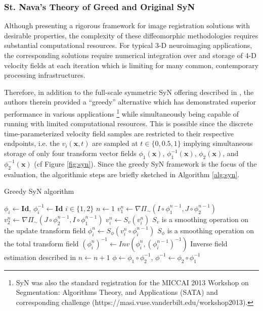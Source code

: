 \documentclass{frontiersSCNS}
\begin{document}
\subsubsection{St. Nava's Theory of Greed and Original SyN}

Although presenting a rigorous framework for image registration solutions
with desirable properties, the complexity of these diffeomorphic methodologies
requires substantial computational resources.  For typical 3-D neuroimaging
applications, the corresponding solutions require numerical integration over
and storage of 4-D velocity fields at each iteration which is limiting for
many common, contemporary processing infrastructures.

Therefore, in addition to the full-scale
symmetric SyN offering described in \cite{avants2008}, the authors therein
provided a ``greedy'' alternative which has demonstrated superior performance
in various applications \citep{avants2011,klein2009,murphy2011}%
\footnote{
SyN was also the standard registration for the MICCAI 2013
Workshop on Segmentation:  Algorithms Theory, and Applications (SATA)
and corresponding challenge (https://masi.vuse.vanderbilt.edu/workshop2013).
}
while simultaneously being capable of running with limited computational
resources.  This is possible since the discrete time-parameterized
velocity field samples are restricted to their respective
endpoints, i.e. the $v_i(\mathbf{x},t)$ are sampled at $t \in \{0,0.5,1\}$
implying simultaneous storage of only four transform vector fields
$\phi_1(\mathbf{x})$,
$\phi_1^{-1}(\mathbf{x})$, $\phi_2(\mathbf{x})$, and $\phi_2^{-1}(\mathbf{x})$
(cf Figure \ref{fig:syn}).  Since the greedy SyN framework is the focus of the evaluation,
the algorithmic steps are briefly sketched
in Algorithm \ref{alg:syn}.

\begin{algorithm}
\caption{Greedy SyN algorithm}
\label{alg:syn}
\begin{algorithmic}
\State $\phi_i \leftarrow \mathbf{Id}$, $\phi_i^{-1} \leftarrow \mathbf{Id}$
\Comment $i \in \{1,2\}$
\State $n \leftarrow 1$
  \State $v_1^n \leftarrow \nabla \Pi_{\sim} \left(I\circ\phi_1^{n-1},J\circ\phi_2^{n-1}\right)$
  \State $v_2^n \leftarrow \nabla \Pi_{\sim} \left(J\circ\phi_2^{n-1},I\circ\phi_1^{n-1}\right)$
  \State $v_i^n \leftarrow S_v( v_i^n )$      \Comment $S_v$ is a smoothing operation on the update transform field
  \State $\phi_i^n \leftarrow S_\phi( v_i^n \circ \phi_i^{n-1} )$      \Comment $S_\phi$ is a smoothing operation on the total transform field
  \State $\left(\phi_i^n\right)^{-1} \leftarrow Inv\left(\phi_i^n, \left(\phi_i^{n-1}\right)^{-1}\right)$
    \Comment Inverse field estimation described in \cite{avants2008}
  \State $n \leftarrow n + 1$
\EndWhile
\State \Return $\phi \leftarrow \phi_1 \circ \phi_2^{-1}$, $\phi^{-1} \leftarrow \phi_2 \circ \phi_1^{-1}$
\end{algorithmic}
\end{algorithm}
\end{document}
